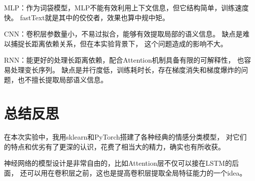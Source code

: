 \documentclass[12pt, UTF8, a4paper]{ctexart}
\begin{document}
MLP：作为词袋模型，MLP不能有效利用上下文信息，但它结构简单，训练速度快。
fastText就是其中的佼佼者，效果也算中规中矩。

CNN：卷积层参数量小，不易过拟合，能够有效提取局部的语义信息。
缺点是难以捕捉长距离依赖关系，但在本实验背景下，
这个问题造成的影响不大。

RNN：能更好的处理长距离依赖，配合Attention机制具备有限的可解释性，
也容易处理变长序列。
缺点是并行度低，训练耗时长，存在梯度消失和梯度爆炸的问题，也不擅长提取局部语义信息。

\section{总结反思}

在本次实验中，我用sklearn和PyTorch搭建了各种经典的情感分类模型，
对它们的特点和优劣有了更深的认识，花费了相当大的精力，确实也有所收获。

神经网络的模型设计是非常自由的，比如Attention层不仅可以接在LSTM的后面，
还可以用在卷积层之前，这也是提高卷积层提取全局特征能力的一个idea。
\end{document}
